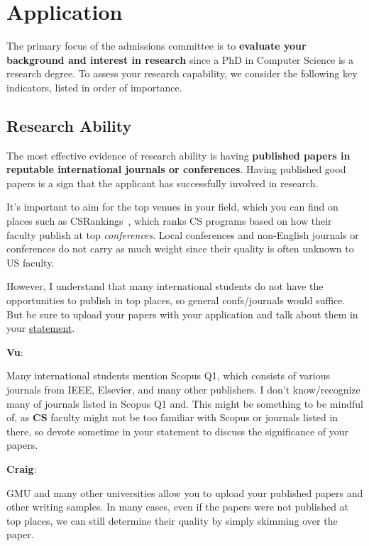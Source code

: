 \documentclass[11pt]{article}
\newenvironment{commentbox}[1][]{
\small
    \begin{cbox}
    \textbf{#1}: 
 }{
   \end{cbox}
}
\begin{document}
\section{Application}\label{sec:application}

The primary focus of the admissions committee is to \textbf{evaluate your background and interest in research} since a PhD in Computer Science
is a research degree. To assess your research capability, we consider
the following key indicators, listed in order of importance.

\subsection{Research Ability}

The most effective evidence of research ability is having \textbf{published papers in reputable international journals or conferences}.
Having published good papers is a sign that the applicant has successfully involved in research.

It's important to aim for the top venues in your field, which you can
find on places such as CSRankings~\cite{csrankings}, which ranks CS programs based on how their faculty publish at top \emph{conferences}. Local conferences and non-English journals or conferences do
not carry as much weight since their quality is often unknown to US faculty.


However, I understand that many international students do not have the opportunities to publish in top places, so general confs/journals would suffice.  But be sure to upload your papers with your application and talk about them in your \hyperref[sec:research-statement]{statement}.

\begin{commentbox}[Vu]
Many international students mention Scopus Q1, which consists of various journals from IEEE, Elsevier, and many other publishers.  I don't know/recognize many of journals listed in Scopus Q1 and. This might be something to be mindful of, as \textbf{CS} faculty might not be too familiar with Scopus or journals listed in there, so devote sometime in your statement to discuss the significance of your papers.
\end{commentbox}

\begin{commentbox}[Craig]
GMU and many other universities allow you to upload your published papers and other writing samples. In many cases, even if the papers were not published at top places, we can still determine their quality by simply skimming over the paper.  
\end{commentbox}
\end{document}
